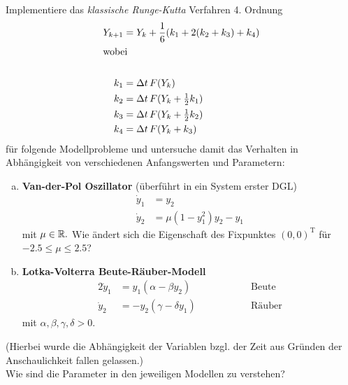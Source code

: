 \documentclass[11pt,a4paper]{article}
\begin{document}



\begin{aufg}
Implementiere das \emph{klassische Runge-Kutta} Verfahren 4. Ordnung
\begin{align*} 
 Y_{k+1} &= Y_k + \frac{1}{6}(k_1 + 2(k_2+k_3) + k_4) \\
\intertext{wobei} \\
k_1 &= \Delta t \,F(Y_k)\\
k_2 &= \Delta t \,F(Y_k + \tfrac{1}{2}k_1) \\
k_3 &= \Delta t \,F(Y_k + \tfrac{1}{2}k_2) \\
k_4 &= \Delta t \,F(Y_k + k_3)
\end{align*}
f\"ur folgende Modellprobleme und untersuche damit das Verhalten in Abh\"angigkeit von verschiedenen Anfangswerten und Parametern:
\begin{enumerate}[a)]
\item \textbf{Van-der-Pol Oszillator} (\"uberf\"uhrt in ein System erster DGL) \begin{align*} 
  \dot{y}_1 &= y_2 \\
  \dot{y}_2 &= \mu(1- y_1^2)y_2 - y_1
\end{align*}
mit $\mu \in \mathbb{R}.$ Wie \"andert sich die Eigenschaft des Fixpunktes $(0,0)^{\mathrm{T}}$ f\"ur $-2.5 \leq \mu \leq 2.5$? 
\item \textbf{Lotka-Volterra Beute-R\"auber-Modell} \begin{alignat*}{2} 
  \dot{y}_1 &= y_1(\alpha - \beta y_2) &\qquad\qquad &\text{Beute}\\
  \dot{y}_2 &= -y_2(\gamma - \delta y_1) &\qquad\qquad &\text{R\"auber}
\end{alignat*}
mit $\alpha, \beta, \gamma, \delta > 0.$ 
\end{enumerate}
(Hierbei wurde die Abh\"angigkeit der Variablen bzgl. der Zeit aus Gr\"unden der Anschaulichkeit fallen gelassen.)\\
Wie sind die Parameter in den jeweiligen Modellen zu verstehen?
\end{aufg}
\end{document}
